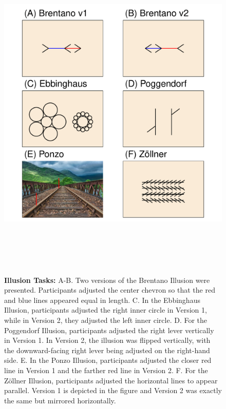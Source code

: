 \documentclass[man, 12pt]{apa7} %
\begin{document}
\begin{figure}
    \centering  %
    \includegraphics[width=6.5in, height=6.5in]{_figs/ill-tasks.pdf}
    \caption{{\bf Illusion Tasks:} A-B. Two versions of the Brentano Illusion were presented. Participants adjusted the center chevron so that the red and blue lines appeared equal in length. C. In the Ebbinghaus Illusion, participants adjusted the right inner circle in Version 1, while in Version 2, they adjusted the left inner circle. D. For the Poggendorf Illusion, participants adjusted the right lever vertically in Version 1. In Version 2, the illusion was flipped vertically, with the downward-facing right lever being adjusted on the right-hand side. E. In the Ponzo Illusion, participants adjusted the closer red line in Version 1 and the farther red line in Version 2. F. For the Zöllner Illusion, participants adjusted the horizontal lines to appear parallel. Version 1 is depicted in the figure and Version 2 was exactly the same but mirrored horizontally.}
    \label{fig:illPlots}
\end{figure}
\end{document}
